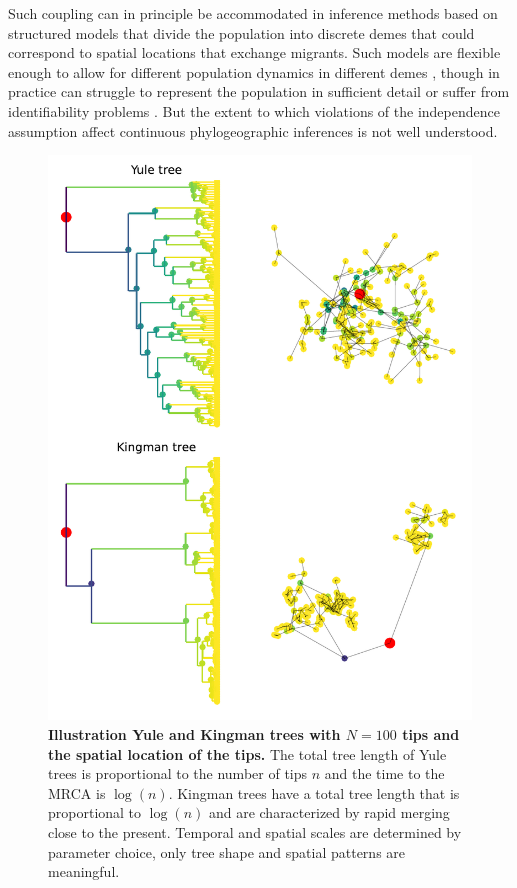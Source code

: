 \documentclass[aps,rmp, twocolumn]{revtex4}
\begin{document}
Such coupling can in principle be accommodated in inference methods based on structured models that divide the population into discrete demes that could correspond to spatial locations that exchange migrants.
Such models are flexible enough to allow for different population dynamics in different demes \citep{vaughan_efficient_2014}, though in practice can struggle to represent the population in sufficient detail or suffer from identifiability problems \citep{layan_impact_2023}.
But the extent to which violations of the independence assumption affect continuous phylogeographic inferences is not well understood.

\begin{figure}[tb]
    \includegraphics*[width=\columnwidth]{figures/illustration_tree.pdf}
    \caption{\label{fig:illustration_tree}{\bf Illustration Yule and Kingman trees with $N=100$ tips and the spatial location of the tips.}
    The total tree length of Yule trees is proportional to the number of tips $n$ and the time to the MRCA is $\log(n)$.
    Kingman trees have a total tree length that is proportional to $\log(n)$ and are characterized by rapid merging close to the present.
    Temporal and spatial scales are determined by parameter choice, only tree shape and spatial patterns are meaningful. }
\end{figure}
\end{document}
